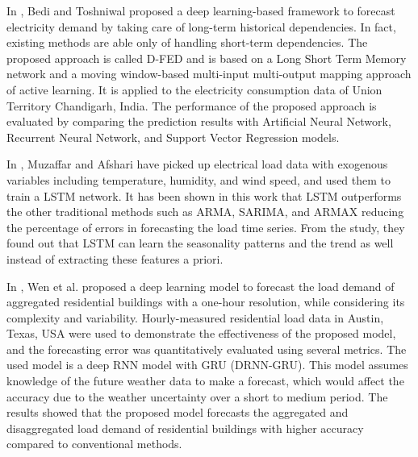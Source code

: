 In \cite{BEDI20191312}, Bedi and Toshniwal proposed a deep learning-based framework to forecast electricity demand by taking care of long-term historical dependencies.
In fact, existing methods are able only of handling short-term dependencies.
The proposed approach is called D-FED and is based on a Long Short Term Memory network and a moving window-based multi-input multi-output mapping approach of active learning.
It is applied to the electricity consumption data of Union Territory Chandigarh, India.
The performance of the proposed approach is evaluated by comparing the prediction results with Artificial Neural Network, Recurrent Neural Network, and Support Vector Regression models.

In \cite{MUZAFFAR20192922}, Muzaffar and Afshari have picked up electrical load data with exogenous variables including temperature, humidity, and wind speed, and used them to train a LSTM network.
It has been shown in this work that LSTM outperforms the other traditional methods such as ARMA, SARIMA, and ARMAX reducing the percentage of errors in forecasting the load time series.
From the study, they found out that LSTM can learn the seasonality patterns and the trend as well instead of extracting these features a priori.

In \cite{WEN2020106073}, Wen et al. proposed a deep learning model to forecast the load demand of aggregated residential buildings with a one-hour resolution, while considering its complexity and variability.
Hourly-measured residential load data in Austin, Texas, USA were used to demonstrate the effectiveness of the proposed model, and the forecasting error was quantitatively evaluated using several metrics.
The used model is a deep RNN model with GRU (DRNN-GRU).
This model assumes knowledge of the future weather data to make a forecast, which would affect the accuracy due to the weather uncertainty over a short to medium period.
The results showed that the proposed model forecasts the aggregated and disaggregated load demand of residential buildings with higher accuracy compared to conventional methods.

